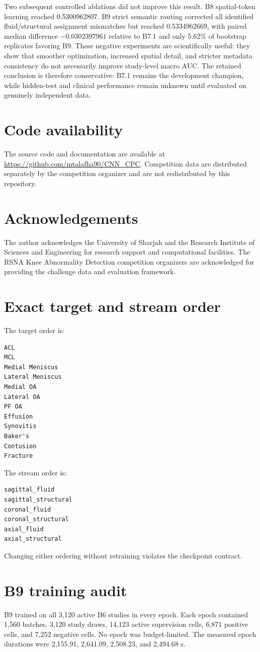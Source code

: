 \documentclass[preprint,12pt]{elsarticle}
\begin{document}
Two subsequent controlled ablations did not improve this result. B8 spatial-token learning reached 0.5300962807. B9 strict semantic routing corrected all identified fluid/structural assignment mismatches but reached 0.5334962669, with paired median difference $-0.0302397961$ relative to B7.1 and only 5.62\% of bootstrap replicates favoring B9. These negative experiments are scientifically useful: they show that smoother optimization, increased spatial detail, and stricter metadata consistency do not necessarily improve study-level macro AUC. The retained conclusion is therefore conservative: B7.1 remains the development champion, while hidden-test and clinical performance remain unknown until evaluated on genuinely independent data.

\section*{Code availability}
The source code and documentation are available at \url{https://github.com/mtalafha90/CNN_CPC}. Competition data are distributed separately by the competition organizer and are not redistributed by this repository.

\section*{Acknowledgements}
The author acknowledges the University of Sharjah and the Research Institute of Sciences and Engineering for research support and computational facilities. The RSNA Knee Abnormality Detection competition organizers are acknowledged for providing the challenge data and evaluation framework.

\appendix
\section{Exact target and stream order}
\label{app:contracts}
The target order is:
\begin{verbatim}
ACL
MCL
Medial Meniscus
Lateral Meniscus
Medial OA
Lateral OA
PF OA
Effusion
Synovitis
Baker's
Contusion
Fracture
\end{verbatim}
The stream order is:
\begin{verbatim}
sagittal_fluid
sagittal_structural
coronal_fluid
coronal_structural
axial_fluid
axial_structural
\end{verbatim}
Changing either ordering without retraining violates the checkpoint contract.

\section{B9 training audit}
\label{app:b9audit}
B9 trained on all 3,120 active B6 studies in every epoch. Each epoch contained 1,560 batches, 3,120 study draws, 14,123 active supervision cells, 6,871 positive cells, and 7,252 negative cells. No epoch was budget-limited. The measured epoch durations were 2,155.91, 2,641.09, 2,508.23, and 2,494.68 s.
\end{document}
